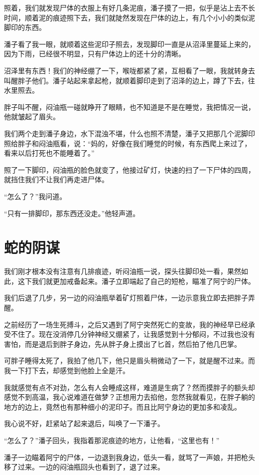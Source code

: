 照着，我们就发现尸体的衣服上有好几条泥痕，潘子摸了一把，似乎是沾上去不长时间，顺着泥的痕迹照下去，我们就陡然发现在尸体的边上，有几个小小的类似泥脚印的东西。

潘子看了我一眼，就顺着这些泥印子照去，发现脚印一直是从沼泽里蔓延上来的，因为下雨，已经很不明显，只有尸体边上的还十分的清晰。

沼泽里有东西！我们的神经绷了一下，喉咙都紧了紧，互相看了一眼，我就转身去叫醒胖子他们。潘子站起来拿起枪，就顺着脚印走到了沼泽的边上，蹲了下去，往水里照去。

胖子叫不醒，闷油瓶一碰就睁开了眼睛，也不知道是不是在睡觉，我把情况一说，他就皱起了眉头。

我们两个走到潘子身边，水下混浊不堪，什么也照不清楚，潘子又把那几个泥脚印照给胖子和闷油瓶看，说：“妈的，好像在我们睡觉的时候，有东西爬上来过了，看来以后打死也不能睡着了。”

照了一下脚印，闷油瓶的脸色就变了，他接过矿灯，快速的扫了一下尸体的四周，就挡住我们不让我们再走进尸体。

“怎么了？”我问道。

“只有一排脚印，那东西还没走。”他轻声道。

\chapter{蛇的阴谋}

我们刚才根本没有注意有几排痕迹，听闷油瓶一说，探头往脚印处一看，果然如此，这下我们就更加戒备起来。潘子立即端起了自己的短枪，瞄准了阿宁的尸体。

我们后退了几步，另一边的闷油瓶举着矿灯照着尸体，一边示意我立即去把胖子弄醒。

之前经历了一场生死搏斗，之后又遇到了阿宁突然死亡的变故，我的神经早已经承受不住了。现在没消停几分钟神经又绷紧了，让我感觉到十分郁闷，不过我也没有害怕，而是退后到胖子身边，先从胖子身上摸出了匕首，然后拍了他几巴掌。

可胖子睡得太死了，我拍了他几下，他只是眉头稍微动了一下，就是醒不过来。而我一下打下去，却感觉到他脸上全是汗。

我就感觉有点不对劲，怎么有人会睡成这样，难道是生病了？然而摸胖子的额头却感觉不到高温，我心说难道在做梦？正想用力去掐他，忽然我就看见，在胖子躺的地方的边上，竟然也有那种细小的泥印子。而且比阿宁身边的更加多和凌乱。

我心说不好，赶紧站了起来退后，叫唤了一下潘子。

“怎么了？”潘子回头，我指着那泥痕迹的地方，让他看，“这里也有！”

潘子一边瞄着阿宁的尸体，一边退到我身边，低头一看，就骂了一声娘，并把枪头移了过来。一边的闷油瓶回头也看到了，退了过来。

